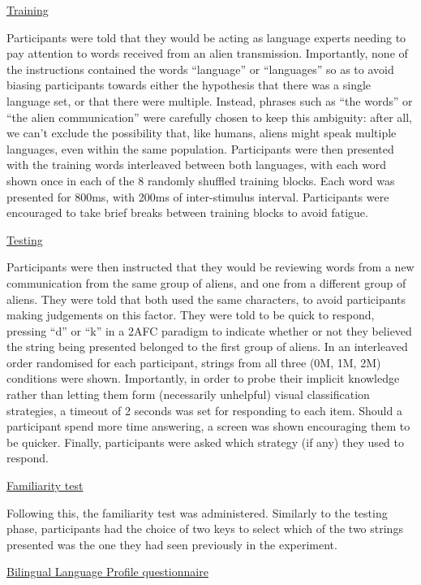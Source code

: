 \noindent \underline{Training}

\noindent
Participants were told that they would be acting as language experts needing to pay attention to words received from an alien transmission. Importantly, none of the instructions contained the words ``language'' or ``languages'' so as to avoid biasing participants towards either the hypothesis that there was a single language set, or that there were multiple. Instead, phrases such as ``the words'' or ``the alien communication'' were carefully chosen to keep this ambiguity: after all, we can't exclude the possibility that, like humans, aliens might speak multiple languages, even within the same population. Participants were then presented with the training words interleaved between both languages, with each word shown once in each of the 8 randomly shuffled training blocks. Each word was presented for 800ms, with 200ms of inter-stimulus interval. Participants were encouraged to take brief breaks between training blocks to avoid fatigue.


\noindent \underline{Testing}

\noindent
Participants were then instructed that they would be reviewing words from a new communication from the same group of aliens, and one from a different group of aliens. They were told that both used the same characters, to avoid participants making judgements on this factor. They were told to be quick to respond, pressing ``d'' or ``k'' in a 2AFC paradigm to indicate whether or not they believed the string being presented belonged to the first group of aliens. In an interleaved order randomised for each participant, strings from all three (0M, 1M, 2M) conditions were shown. Importantly, in order to probe their implicit knowledge rather than letting them form (necessarily unhelpful) visual classification strategies, a timeout of 2 seconds was set for responding to each item. Should a participant spend more time answering, a screen was shown encouraging them to be quicker. Finally, participants were asked which strategy (if any) they used to respond.

\noindent \underline{Familiarity test}

\noindent
Following this, the familiarity test was administered. Similarly to the testing phase, participants had the choice of two keys to select which of the two strings presented was the one they had seen previously in the experiment.

\noindent \underline{Bilingual Language Profile questionnaire}

